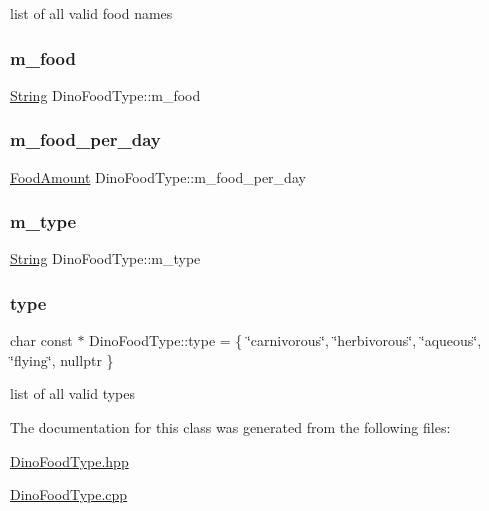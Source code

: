 list of all valid food names 

\mbox{\label{classDinoFoodType_a4cd78167ce1e2d367ba0eaf2ceb757e6}} 
\subsubsection{\texorpdfstring{m\+\_\+food}{m\_food}}
{\footnotesize\ttfamily \hyperlink{classString}{String} Dino\+Food\+Type\+::m\+\_\+food\hspace{0.3cm}{\ttfamily [protected]}}

\mbox{\label{classDinoFoodType_a7fce2386b06bca376525c454a1b8e572}} 
\subsubsection{\texorpdfstring{m\+\_\+food\+\_\+per\+\_\+day}{m\_food\_per\_day}}
{\footnotesize\ttfamily \hyperlink{DinoFoodType_8hpp_a81be3c5791355e37ef9afec946f6ff50}{Food\+Amount} Dino\+Food\+Type\+::m\+\_\+food\+\_\+per\+\_\+day\hspace{0.3cm}{\ttfamily [protected]}}

\mbox{\label{classDinoFoodType_adc04adf9e6372245441b806c40d90f6e}} 
\subsubsection{\texorpdfstring{m\+\_\+type}{m\_type}}
{\footnotesize\ttfamily \hyperlink{classString}{String} Dino\+Food\+Type\+::m\+\_\+type\hspace{0.3cm}{\ttfamily [protected]}}

\mbox{\label{classDinoFoodType_afb414c3cfef06b7e74361f92296a3b13}} 
\subsubsection{\texorpdfstring{type}{type}}
{\footnotesize\ttfamily char const  $\ast$ Dino\+Food\+Type\+::type = \{ \char`\"{}carnivorous\char`\"{}, \char`\"{}herbivorous\char`\"{}, \char`\"{}aqueous\char`\"{}, \char`\"{}flying\char`\"{}, nullptr \}\hspace{0.3cm}{\ttfamily [static]}}



list of all valid types 



The documentation for this class was generated from the following files\+:\begin{DoxyCompactItemize}
\item 
\hyperlink{DinoFoodType_8hpp}{Dino\+Food\+Type.\+hpp}\item 
\hyperlink{DinoFoodType_8cpp}{Dino\+Food\+Type.\+cpp}\end{DoxyCompactItemize}
